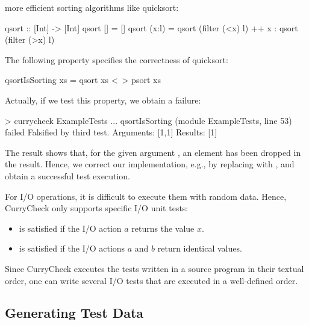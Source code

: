 more efficient sorting algorithms like quicksort:
\begin{curry}
qsort :: [Int] -> [Int] 
qsort []     = []
qsort (x:l)  = qsort (filter (<x) l) ++ x : qsort (filter (>x) l)
\end{curry}
The following property specifies the correctness of quicksort:
\begin{curry}
qsortIsSorting xs = qsort xs <~> psort xs
\end{curry}
Actually, if we test this property, we obtain a failure:
%
\begin{curry}
> currycheck ExampleTests
...
qsortIsSorting (module ExampleTests, line 53) failed
Falsified by third test.
Arguments:
[1,1]
Results:
[1]
\end{curry}
%
The result shows that, for the given argument \code{[1,1]},
an element has been dropped in the result.
Hence, we correct our implementation, e.g., by replacing
 with , and obtain a successful test execution.

For I/O operations, it is difficult to execute them with random data.
Hence, CurryCheck only supports specific I/O unit tests:
\begin{itemize}
\item {} is satisfied if the I/O action $a$
returns the value $x$.
\item {} is satisfied if the I/O actions
$a$ and $b$ return identical values.
\end{itemize}
%
Since CurryCheck executes the tests written in a source program
in their textual order, one can write several I/O tests that are
executed in a well-defined order.


\subsection{Generating Test Data}


